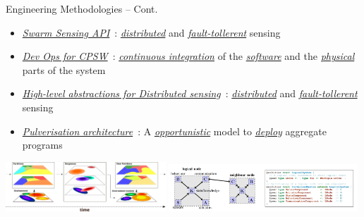 \documentclass[presentation, 9pt,169]{beamer}\mode<presentation>{\usetheme{AMSBolognaFC}}
\begin{document}
\begin{frame}{Engineering Methodologies -- Cont.}
  \begin{itemize}
    \item \emph{\underline{Swarm Sensing API}}~\cite{swarm-clustering}: \emph{\underline{distributed}} and \emph{\underline{fault-tollerent}} sensing
    \item \emph{\underline{Dev Ops for CPSW}}~\cite{casadei2022towards}: \emph{\underline{continuous integration}} of the \emph{\underline{software}} and the \emph{\underline{physical}} parts of the system
    \item \emph{\underline{High-level abstractions for Distributed sensing}}~\cite{aguzzi2022dynamic}: \emph{\underline{distributed}} and \emph{\underline{fault-tollerent}} sensing
    \item \emph{\underline{Pulverisation architecture}}~\cite{aguzzi2021towards}: A \emph{\underline{opportunistic}} model to \emph{\underline{deploy}} aggregate programs
  \end{itemize}
  \vspace{0.5cm}
  \includegraphics[width=0.45\textwidth]{img/action-with-multilayer.pdf}
  \includegraphics[width=0.53\textwidth]{img/screenshot.png}
  
\end{frame}
\end{document}
